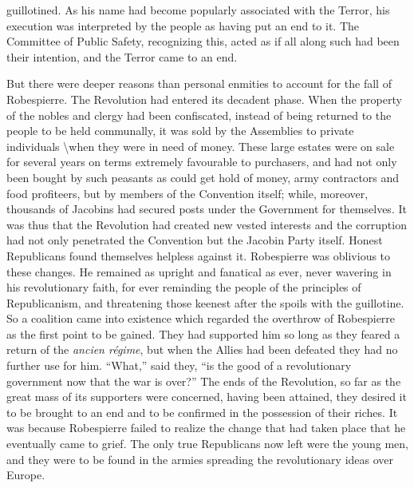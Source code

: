 \documentclass{book}
\begin{document}
guillotined. As his name had become popularly associated with the Terror, his execution was interpreted by the people as having put an end to it. The Committee of Public Safety, recognizing this, acted as if all along such had been their intention, and the Terror came to an end.

But there were deeper reasons than personal enmities to account for the fall of Robespierre. The Revolution had entered its decadent phase. When the property of the nobles and clergy had been confiscated, instead of being returned to the people to be held communally, it was sold by the Assemblies to private individuals \textbackslash{}when they were in need of money. These large estates were on sale for several years on terms extremely favourable to purchasers, and had not only been bought by such peasants as could get hold of money, army contractors and food profiteers, but by members of the Convention itself; while, moreover, thousands of Jacobins had secured posts under the Government for themselves. It was thus that the Revolution had created new vested interests and the corruption had not only penetrated the Convention but the Jacobin Party itself. Honest Republicans found themselves helpless against it. Robespierre was oblivious to these changes. He remained as upright and fanatical as ever, never wavering in his revolutionary faith, for ever reminding the people of the principles of Republicanism, and threatening those keenest after the spoils with the guillotine. So a coalition came into existence which regarded the overthrow of Robespierre as the first point to be gained. They had supported him so long as they feared a return of the \emph{ancien régime}, but when the Allies had been defeated they had no further use for him. “What,” said they, “is the good of a revolutionary government now that the war is over?” The ends of the Revolution, so far as the great mass of its supporters were concerned, having been attained, they desired it to be brought to an end and to be confirmed in the possession of their riches. It was because Robespierre failed to realize the change that had taken place that he eventually came to grief. The only true Republicans now left were the young men, and they were to be found in the armies spreading the revolutionary ideas over Europe.
\end{document}
